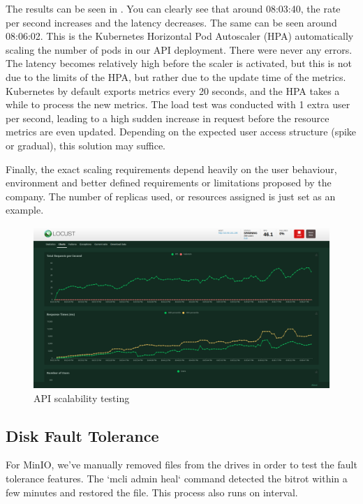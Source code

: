 \documentclass{report}
\begin{document}
    The results can be seen in . You can clearly see that around 08:03:40, the rate per second increases and the latency decreases. The same can be seen around 08:06:02. This is the Kubernetes Horizontal Pod Autoscaler (HPA) automatically scaling the number of pods in our API deployment. There were never any errors. The latency becomes relatively high before the scaler is activated, but this is not due to the limits of the HPA, but rather due to the update time of the metrics. Kubernetes by default exports metrics every 20 seconds, and the HPA takes a while to process the new metrics. The load test was conducted with 1 extra user per second, leading to a high sudden increase in request before the resource metrics are even updated. Depending on the expected user access structure (spike or gradual), this solution may suffice.

    Finally, the exact scaling requirements depend heavily on the user behaviour, environment and better defined requirements or limitations proposed by the company. The number of replicas used, or resources assigned is just set as an example.

    \begin{figure}[H]
        \centering
        \includegraphics[width=\textwidth]{images/load-testing-success}
        \caption{API scalability testing}
        \label{fig:load-testing}
    \end{figure}

    \subsection{Disk Fault Tolerance}

    For MinIO, we've manually removed files from the drives in order to test the fault tolerance features. The `mcli admin heal` command detected the bitrot within a few minutes and restored the file. This process also runs on interval.
\end{document}
